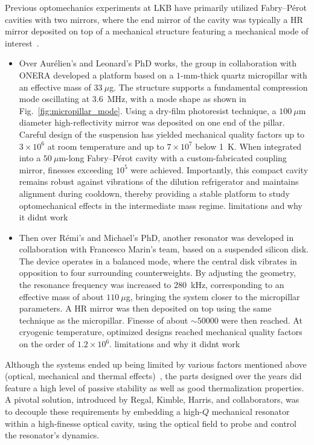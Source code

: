 Previous optomechanics experiments at LKB have primarily utilized Fabry--Pérot cavities with two mirrors, where the end mirror of the cavity was typically a HR mirror deposited on top of a mechanical structure featuring a mechanical mode of interest~\cite{}. 
\begin{itemize}
\item Over Aurélien's and Leonard's PhD works, the group in collaboration with ONERA developed a platform based on a $1$-mm-thick quartz micropillar with an effective mass of $33~\mu$g. The structure supports a fundamental compression mode oscillating at $3.6$~MHz, with a mode shape as shown in Fig.~\ref{fig:micropillar_mode}. Using a dry-film photoresist technique, a $100~\mu$m diameter high-reflectivity mirror was deposited on one end of the pillar. Careful design of the suspension has yielded mechanical quality factors up to $3\times 10^{6}$ at room temperature and up to $7\times 10^{7}$ below 1~K. When integrated into a $50~\mu$m-long Fabry--Pérot cavity with a custom-fabricated coupling mirror, finesses exceeding $10^{5}$ were achieved. Importantly, this compact cavity remains robust against vibrations of the dilution refrigerator and maintains alignment during cooldown, thereby providing a stable platform to study optomechanical effects in the intermediate mass regime. \color{red} limitations and why it didnt work \color{black}


\item Then over Rémi's and Michael's PhD, another resonator was developed in collaboration with Francesco Marin’s team, based on a suspended silicon disk. The device operates in a balanced mode, where the central disk vibrates in opposition to four surrounding counterweights. By adjusting the geometry, the resonance frequency was increased to $280$~kHz, corresponding to an effective mass of about $110~\mu$g, bringing the system closer to the micropillar parameters. A HR mirror was then deposited on top using the same technique as the micropillar. Finesse of about $\sim 50 000$ were then reached. At cryogenic temperature, optimized designs reached mechanical quality factors on the order of $1.2 \times 10^{6}$.\color{red} limitations and why it didnt work \color{black}

\end{itemize}

Although the systems ended up being limited by various factors mentioned above (optical, mechanical and thermal effects)~\cite{}, the parts designed over the years did feature a high level of passive stability as well as good thermalization properties.  A pivotal solution, introduced by Regal, Kimble, Harris, and collaborators\cite{Regal2008,Harris2008}, was to decouple these requirements by embedding a high-$Q$ mechanical resonator within a high-finesse optical cavity, using the optical field to probe and control the resonator’s dynamics.

